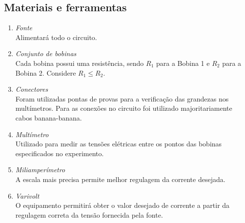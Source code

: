 \documentclass[a4paper,12pt,oneside,openany,table,xcdraw]{article}
\begin{document}
\subsection{Materiais e ferramentas} %
\begin{enumerate}[1 - ]
\item \emph{Fonte}\\
Alimentará todo o circuito.

\item \emph{Conjunto de bobinas}\\
Cada bobina possui uma resistência, sendo $R_1$ para a Bobina 1 e $R_2$ para a Bobina 2. Considere $R_1\leq R_2$.

\item \emph{Conectores}\\
Foram utilizadas pontas de provas para a verificação das grandezas nos multímetros. Para as conexões no circuito foi utilizado majoritariamente cabos banana-banana.

\item \emph{Multímetro}\\
Utilizado para medir as tensões elétricas entre os pontos das bobinas especificados no experimento.

\item \emph{Miliamperímetro}\\
A escala mais precisa permite melhor regulagem da corrente desejada.

\item \emph{Varivolt}\\
O equipamento permitirá obter o valor desejado de corrente a partir da regulagem correta da tensão fornecida pela fonte.


\end{enumerate}
\end{document}
